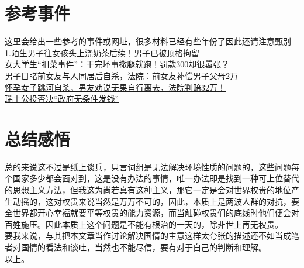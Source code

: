 \documentclass[supercite]{Experimental_Report}
\theoremstyle{definition}
\begin{document}
		\section{参考事件}
		这里会给出一些参考的事件或网址，很多材料已经有些年份了因此还请注意甄别\\
		\href{https://www.163.com/dy/article/G9UU6DCF0537A693.html}{1.陌生男子往女孩头上浇奶茶后续！男子已被顶格拘留}\\
		\href{https://www.163.com/dy/article/I7DIVRJB0553QMAX.html}{女大学生“扣菜事件”：干完坏事撒腿就跑！罚款300却很嚣张？}\\
		\href{https://www.thepaper.cn/newsDetail_forward_23175763}{男子目睹前女友与人同居后自杀，法院：前女友补偿男子父母2万}\\
		\href{https://zhuanlan.zhihu.com/p/462641661}{怀孕女子跳河自杀，男友劝说无果自行离去，法院判赔32万！}\\
		\href{https://www.xinhuanet.com/world/2016-06/06/c_129043067.htm}{瑞士公投否决“政府无条件发钱”}\\
		
		\section{总结感悟}
		总的来说这不过是纸上谈兵，只言词组是无法解决环境性质的问题的，这些问题每个国家多少都会面对到，这是没有办法的事情，唯一办法即是找到一种可上位替代的思想主义方法，但我这为尚若真有这种主义，那它一定是会对世界权贵的地位产生动摇的，这对权贵来说当然是万万不可的，因此，本质上是两波人群的对抗，要全世界都开心幸褔就要平等权贵的能力资源，而当触碰权贵们的底线时他们便会对百姓施压。因此本质上这个问题是不能有根治的一天的，除非世上再无权贵。
		\\要我来说，与其把本文章当作讨论解决国情的主意这样太夸张的描述还不如当成笔者对国情的看法和谈吐，当然也不能尽信，要有对于自己的判断和理解。
		\\以上。
		
	
\end{document}
